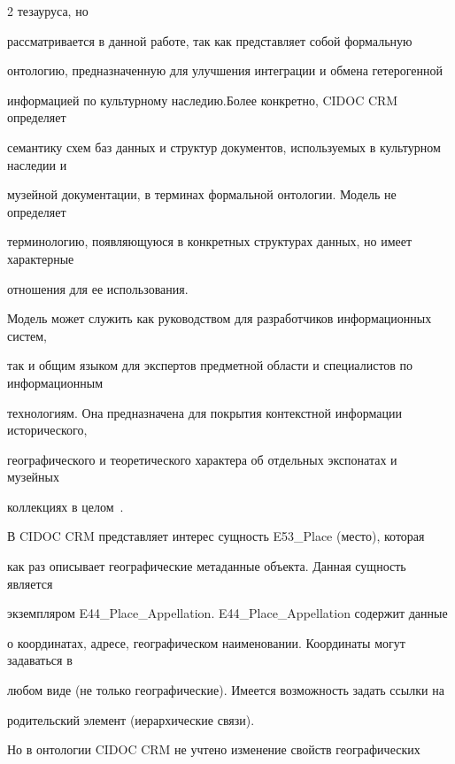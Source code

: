\begin{multicols}{2}
тезауруса, но\linebreak\vspace*{-12pt}



\pagebreak



\noindent

 рассматривается в данной работе, так как пред\-став\-ля\-ет собой формальную 

онтологию, предназначенную для улучшения интеграции и обмена гетеро\-генной 

информацией по культурному наследию.\linebreak Более конкретно, CIDOC CRM определяет 

семантику схем баз данных и структур документов, используемых в культурном наследии и 

музейной документации, в терминах формальной онтологии. Модель не определяет 

терминологию, появляющуюся в конкретных структурах данных, но имеет характерные 

отношения для ее использования.

  

  Модель может служить как руководством для разработчиков информационных систем, 

так и общим языком для экспертов предметной области и специалистов по информационным 

технологиям. Она предназначена для покрытия контекстной информации исторического, 

географического и теоретического характера об отдельных экспонатах и музейных 

коллекциях в целом~\cite{6-sk}.

  

  В {CIDOC CRM} представляет интерес сущность {E53\_Place} (место), которая 

как раз описывает географические метаданные объекта. Данная сущность является 

экземпляром {E44\_Place\_Appellation}. {E44\_Place\_Appellation} содержит данные 

о координатах, адресе, географическом наименовании. Координаты могут задаваться в 

любом виде (не только географические). Имеется возможность задать ссылки на 

родительский элемент (иерархические связи).

  

  Но в онтологии {CIDOC CRM} не учтено изменение свойств географических 


\end{multicols}
